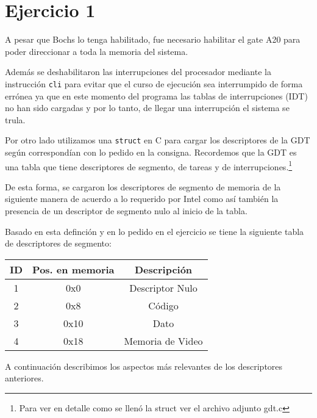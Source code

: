 \section{Ejercicio 1}

A pesar que Bochs lo tenga habilitado, fue necesario habilitar el gate A20 para poder direccionar a toda la memoria del sistema.


Además se deshabilitaron las interrupciones del procesador mediante la instrucción \texttt{cli} para evitar que el curso de ejecución sea interrumpido de forma errónea ya que en este momento del programa las tablas de interrupciones (IDT) no han sido cargadas y por lo tanto, de llegar una interrupción el sistema se trula. %

Por otro lado utilizamos una \texttt{struct} en C para cargar los descriptores de la GDT según correspondían con lo pedido en la consigna. Recordemos que la GDT es una tabla que tiene descriptores de segmento, de tareas y de interrupciones.\footnote{Para ver en detalle como se llenó la struct ver el archivo adjunto gdt.c}

De esta forma, se cargaron los descriptores de segmento de memoria de la siguiente manera de acuerdo a lo requerido por Intel como así también la presencia de un descriptor de segmento nulo al inicio de la tabla.


Basado en esta definción y en lo pedido en el ejercicio se tiene la siguiente tabla de descriptores de segmento:

\begin{center}
\begin{tabular}{|c|c|c|}
\hline
ID & Pos. en memoria & Descripción\\
\hline
1 & 0x0 & Descriptor Nulo \\
2 & 0x8 & Código \\
3 & 0x10 & Dato \\
4 & 0x18 & Memoria de Video \\
\hline
\end{tabular}
\end{center}

A continuación describimos los aspectos más relevantes de los descriptores anteriores.

